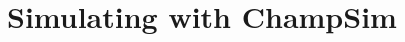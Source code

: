 \documentclass[11pt, swedish, openany]{book}
\begin{document}
\chapter{Simulating with ChampSim}
\end{document}
